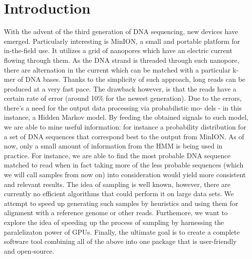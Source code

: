 \chapter{Introduction}

With the advent of the third generation of DNA sequencing, new devices have emerged.
Particularly interesting is MinION, a small and portable platform for in-the-field use.
It utilizes a grid of nanopores which have an electric current flowing through them.
As the DNA strand is threaded through such nanopore, there are alternation in the
current which can be matched with a particular k-mer of DNA bases. Thanks to the
simplicity of such approach, long reads can be produced at a very fast pace. The
drawback however, is that the reads have a certain rate of error (around 10\% for the
newest generation).
Due to the errors, there's a need for the output data processing via probabilistic mo-
dels - in this instance, a Hidden Markov model. By feeding the obtained signals to such
model, we are able to mine useful information: for instance a probability distribution
for a set of DNA sequences that correspond best to the output from MinION.
As of now, only a small amount of information from the HMM is being used in
practice. For instance, we are able to find the most probable DNA sequence matched
to read when in fact taking more of the less probable sequences (which we will call
samples from now on) into consideration would yield more consistent and relevant
results. The idea of sampling is well known, however, there are currently no efficient
algorithms that could perform it on large data sets.
We attempt to speed up generating such samples by heuristics and using them for
alignment with a reference genome or other reads. Furthemore, we want to explore the
idea of speeding up the process of sampling by harnessing the paralelizaton power of
GPUs. Finally, the ultimate goal is to create a complete software tool combining all of
the above into one package that is user-friendly and open-source.